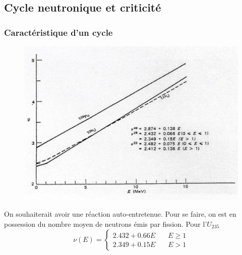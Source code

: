\subsection{Cycle neutronique et criticité}
\subsubsection{Caractéristique d'un cycle}
	\begin{figure}
	\vspace{-5mm}
	\includegraphics[scale=0.10]{ch1/image6.png}
	\end{figure}
On souhaiterait avoir une réaction auto-entretenue. Pour se faire, on est en possession du nombre 
moyen de neutrons émis par fission. Pour l'$U_{235}$
\begin{equation}
\nu(E) = \left\{\begin{array}{ll}
2.432 +0.66E&\quad E\geq 1\\
2.349+0.15E&\quad E>1
\end{array}\right.
\end{equation}

